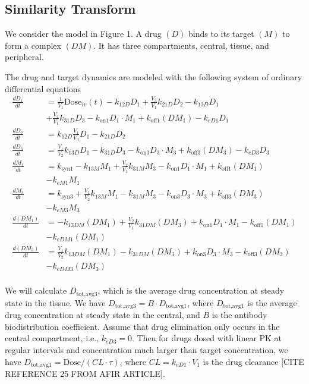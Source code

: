
\subsection{Similarity Transform}

We consider the model in Figure 1. A drug $(D)$ binds to its target $(M)$ to form a complex $(DM)$. It has three compartments, central, tissue, and peripheral.

The drug and target dynamics are modeled with the following system of ordinary differential equations
\begin{align}
\frac{dD_1}{dt} &= \frac{1}{V_1}\text{Dose}_{iv}(t) - k_{12D}D_1 + \frac{V_3}{V_1}k_{21D}D_2 - k_{13D}D_1 \nonumber \\
&+ \frac{V_2}{V_1}k_{31D}D_3 - k_{\text{on}1}D_1 \cdot M_1 + k_{\text{off}1}(DM_1) - k_{eD1}D_1 \\
\frac{dD_2}{dt} &= k_{12D}\frac{V_1}{V_3}D_1 - k_{21D}D_2 \\
\frac{dD_3}{dt} &= \frac{V_1}{V_2}k_{13D}D_1 - k_{31D}D_3 - k_{\text{on}3}D_3 \cdot M_3 + k_{\text{off}3}(DM_3) - k_{eD3}D_3 \\
\frac{dM_1}{dt} &= k_{\text{syn}1} - k_{13M}M_1 + \frac{V_2}{V_1}k_{31M}M_3 - k_{\text{on}1}D_1 \cdot M_1 + k_{\text{off}1}(DM_1) \nonumber \\ 
&- k_{eM1}M_1 \\
\frac{dM_3}{dt} &= k_{\text{syn}3} + \frac{V_1}{V_2}k_{13M}M_1 - k_{31M}M_3 - k_{\text{on}3}D_3 \cdot M_3 + k_{\text{off}3}(DM_3) \nonumber \\ 
&- k_{eM3}M_3 \\
\frac{d(DM_1)}{dt} &= - k_{13DM}(DM_1) + \frac{V_2}{V_1}k_{31DM}(DM_3) + k_{\text{on}1}D_1 \cdot M_1 - k_{\text{off}1}(DM_1) \nonumber \\ 
&- k_{eDM1}(DM_1) \\
\frac{d(DM_3)}{dt} &= \frac{V_1}{V_2}k_{13DM}(DM_1) - k_{31DM}(DM_3) + k_{\text{on}3}D_3 \cdot M_3 - k_{\text{off}3}(DM_3) \nonumber \\ 
&- k_{eDM3}(DM_3) \\
\end{align}

We will calculate $D_{\text{tot,avg}3}$, which is the average drug concentration at steady state in the tissue. We have $D_{\text{tot,avg}3} = B \cdot D_{\text{tot,avg}1}$, where $D_{\text{tot,avg}1}$ is the average drug concentration at steady state in the central, and $B$ is the antibody biodistribution coefficient. Assume that drug elimination only occurs in the central compartment, i.e., $k_{eD3} = 0$. Then for drugs dosed with linear PK at regular intervals and concentration much larger than target concentration, we have $D_{\text{tot,avg}1} = \text{Dose}/(CL \cdot \tau)$, where $CL = k_{eD1} \cdot V_1$ is the drug clearance [CITE REFERENCE 25 FROM AFIR ARTICLE]. \\

